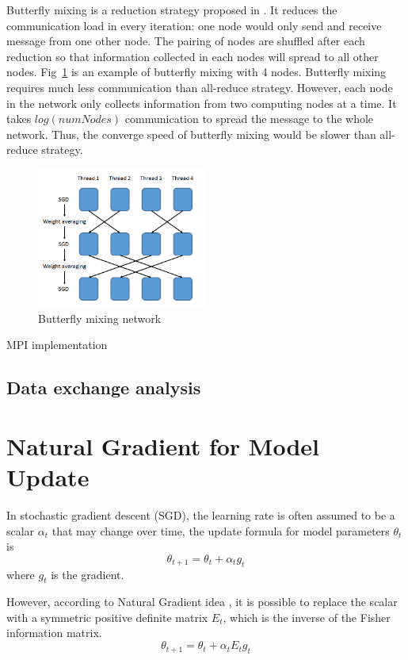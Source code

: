 \documentclass{article}
\begin{document}
Butterfly mixing is a reduction strategy proposed in \cite{zhao2013butterfly}. It reduces the communication load in 
every iteration: one node would only send and receive message from one other node. The pairing of nodes are shuffled after
each reduction so that information collected in each nodes will spread to all other nodes. Fig~\ref{fig:butterfly} 
is an example of butterfly mixing with 4 nodes. Butterfly mixing requires much less communication than all-reduce 
strategy. However, each node in the network only collects information from two computing nodes at a time.
It takes $log(numNodes)$ communication to spread the message to the whole network. Thus, the converge speed 
of butterfly mixing would be slower than all-reduce strategy. 
\begin{figure}[htb]
  \centering
  \includegraphics[width=0.5\textwidth]{butterfly.png}
  \caption{Butterfly mixing network}
  \label{fig:butterfly}
\end{figure}

MPI implementation

\subsection{Data exchange analysis}

\section{Natural Gradient for Model Update}
In stochastic gradient descent (SGD), the learning rate is often assumed to be a scalar $\alpha_t$ that may change over time,
the update formula for model parameters $\theta_{t}$ is
\begin{equation}
\theta_{t+1} = \theta_{t} + \alpha_t g_t
\end{equation}
where $g_t$ is the gradient.

However, according to Natural Gradient idea \cite{murata1999statistical,roux2008topmoumoute}, it is possible to replace 
the scalar with a symmetric positive definite matrix $E_t$, which is the inverse of the Fisher information matrix.
\begin{equation}
\theta_{t+1} = \theta_{t} + \alpha_t E_t g_t
\end{equation}
\end{document}

